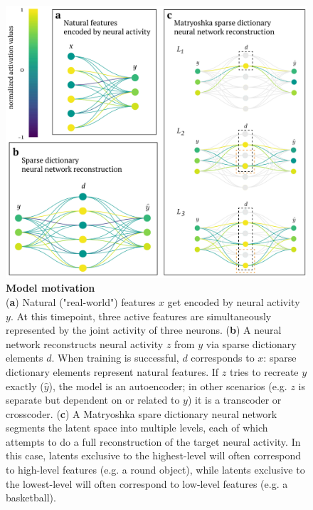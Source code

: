 \begin{figure}[h]
    \begin{minipage}{0.64\linewidth}
    \includegraphics[width=\linewidth]{figures/sdnn_arch.pdf}
    \end{minipage}%
    \begin{minipage}{0.35\linewidth}
    \caption{
        \textbf{Model motivation} \\
        \small
        (\textbf{a}) Natural ("real-world") features $x$ get encoded by neural activity $y$. At this timepoint, three active features are simultaneously represented by the joint activity of three neurons. (\textbf{b}) A neural network reconstructs neural activity $z$ from $y$ via sparse dictionary elements $d$. When training is successful, $d$ corresponds to $x$: sparse dictionary elements represent natural features. If $z$ tries to recreate $y$ exactly ($\hat{y}$), the model is an autoencoder; in other scenarios (e.g. $z$ is separate but dependent on or related to $y$) it is a transcoder or crosscoder. (\textbf{c}) A Matryoshka spare dictionary neural network segments the latent space into multiple levels, each of which attempts to do a full reconstruction of the target neural activity. In this case, latents exclusive to the highest-level will often correspond to high-level features (e.g. a round object), while latents exclusive to the lowest-level will often correspond to low-level features (e.g. a basketball).
    }
    \label{fig:sdnn_arch}
    \end{minipage}
\end{figure}

